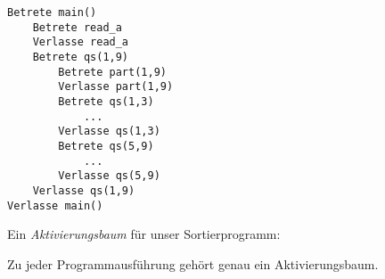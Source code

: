 \begin{verbatim}
Betrete main()
    Betrete read_a
    Verlasse read_a
    Betrete qs(1,9)
        Betrete part(1,9)
        Verlasse part(1,9)
        Betrete qs(1,3)
            ...
        Verlasse qs(1,3)
        Betrete qs(5,9)
            ...
        Verlasse qs(5,9)
    Verlasse qs(1,9)
Verlasse main()
\end{verbatim}
Ein \emph{Aktivierungsbaum} für unser Sortierprogramm:
\begin{center}
\end{center}
Zu jeder Programmausführung gehört genau ein Aktivierungsbaum.
